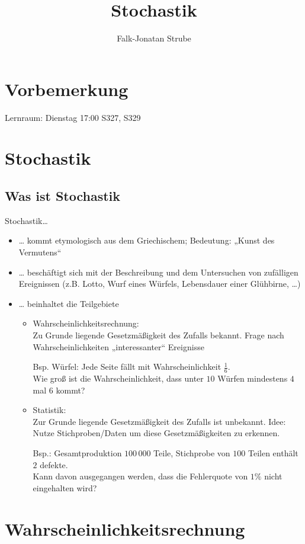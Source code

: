 \documentclass{scrreprt}
\title{Stochastik}
\author{Falk-Jonatan Strube}
\begin{document}
\maketitle
\tableofcontents

\chapter*{Vorbemerkung}
Lernraum: Dienstag 17:00 S327, S329

\chapter*{Stochastik}

\section*{Was ist Stochastik}
Stochastik…
\begin{itemize}
\item … kommt etymologisch aus dem Griechischem; Bedeutung: „Kunst des Vermutens“
\item … beschäftigt sich mit der Beschreibung und dem Untersuchen von zufälligen Ereignissen (z.B. Lotto, Wurf eines Würfels, Lebensdauer einer Glühbirne, …)
\item … beinhaltet die Teilgebiete
\begin{itemize}
\item Wahrscheinlichkeitsrechnung:\\
Zu Grunde liegende Gesetzmäßigkeit des Zufalls bekannt. Frage nach Wahrscheinlichkeiten „interessanter“ Ereignisse

Bsp. Würfel: Jede Seite fällt mit Wahrscheinlichkeit $\frac{1}{6}$. \\
Wie groß ist die Wahrscheinlichkeit, dass unter $10$ Würfen mindestens $4$ mal 6 kommt? 
\item Statistik:\\
Zur Grunde liegende Gesetzmäßigkeit des Zufalls ist unbekannt. Idee: Nutze Stichproben/Daten um diese Gesetzmäßigkeiten zu erkennen.

Bsp.: Gesamtproduktion $100\,000$ Teile, Stichprobe von $100$ Teilen enthält $2$ defekte. \\
Kann davon ausgegangen werden, dass die Fehlerquote von $1\%$ nicht eingehalten wird?
\end{itemize}
\end{itemize}

\chapter{Wahrscheinlichkeitsrechnung}
\end{document}
